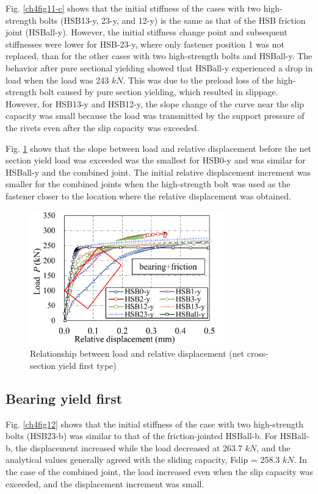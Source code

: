 Fig. \ref{ch4fig11-c} shows that the initial stiffness of the cases with two high-strength bolts (HSB13-y, 23-y, and 12-y) is the same as that of the HSB friction joint (HSBall-y). However, the initial stiffness change point and subsequent stiffnesses were lower for HSB-23-y, where only fastener position 1 was not replaced, than for the other cases with two high-strength bolts and HSBall-y. The behavior after pure sectional yielding showed that HSBall-y experienced a drop in load when the load was 243 $kN$. This was due to the preload loss of the high-strength bolt caused by pure section yielding, which resulted in slippage. However, for HSB13-y and HSB12-y, the slope change of the curve near the slip capacity was small because the load was transmitted by the support pressure of the rivets even after the slip capacity was exceeded.

Fig. \ref{ch4fig13} shows that the slope between load and relative displacement before the net section yield load was exceeded was the smallest for HSB0-y and was similar for HSBall-y and the combined joint. The initial relative displacement increment was smaller for the combined joints when the high-strength bolt was used as the fastener closer to the location where the relative displacement was obtained.

\begin{figure}[htbp]
    \centering
    \includegraphics[width=0.75\textwidth]{imgs/ch4/fig13.pdf}
    \caption{Relationship between load and relative displacement (net cross-section yield first type)}
    \label{ch4fig13}
\end{figure}

\subsection{Bearing yield first}

Fig. \ref{ch4fig12} shows that the initial stiffness of the case with two high-strength bolts (HSB23-b) was similar to that of the friction-jointed HSBall-b. For HSBall-b, the displacement increased while the load decreased at 263.7 $kN$, and the analytical values generally agreed with the sliding capacity, Fslip  = 258.3 $kN$. In the case of the combined joint, the load increased even when the slip capacity was exceeded, and the displacement increment was small.

